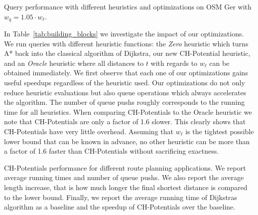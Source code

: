 \documentclass[letterpaper]{article} %
\begin{document}
\begin{table}
\centering
\caption{Query performance with different heuristics and optimizations on OSM Ger with $w_q = 1.05 \cdot w_\ell$.}\label{tab:building_blocks}

\end{table}

In Table~\ref{tab:building_blocks} we investigate the impact of our optimizations.
We run queries with different heuristic functions: the \emph{Zero} heuristic which turns A* back into the classical algorithm of Dijkstra, our new CH-Potential heuristic, and an \emph{Oracle} heuristic where all distances to $t$ with regards to $w_\ell$ can be obtained immediately.
We first observe that each one of our optimizations gains useful speedups regardless of the heuristic used.
Our optimizations do not only reduce heuristic evaluations but also queue operations which always accelerates the algorithm.
The number of queue pushs roughly corresponds to the running time for all heuristics.
When comparing CH-Potentials to the Oracle heuristic we note that CH-Potentials are only a factor of 1.6 slower.
This clearly shows that CH-Potentials have very little overhead.
Assuming that $w_\ell$ is the tightest possible lower bound that can be known in advance, no other heuristic can be more than a factor of 1.6 faster than CH-Potentials without sacrificing exactness.

\begin{table}
\centering
\caption{
CH-Potentials performance for different route planning applications.
We report average running times and number of queue pushs.
We also report the average length increase, that is how much longer the final shortest distance is compared to the lower bound.
Finally, we report the average running time of Dijkstras algorithm as a baseline and the speedup of CH-Potentials over the baseline.
}\label{tab:applications}

\end{table}
\end{document}
